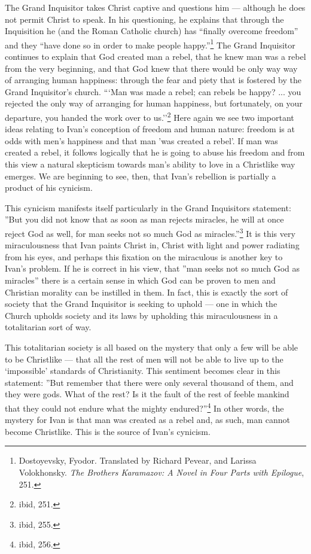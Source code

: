 	The Grand Inquisitor takes Christ captive and questions him --- although he does not permit Christ to speak. In his questioning, he explains that through the Inquisition he (and the Roman Catholic church) has ``finally overcome freedom'' and they ``have done so in order to make people happy.''\footnote{Dostoyevsky, Fyodor. Translated by Richard Pevear, and Larissa Volokhonsky. \emph{The Brothers Karamazov: A Novel in Four Parts with Epilogue}, 251.} The Grand Inquisitor continues to explain that God created man a rebel, that he knew man was a rebel from the very beginning, and that God knew that there would be only way way of arranging human happiness: through the fear and piety that is fostered by the Grand Inquisitor's church. ```Man was made a rebel; can rebels be happy? ... you rejected the only way of arranging for human happiness, but fortunately, on your departure, you handed the work over to us.''\footnote{ibid, 251.} Here again we see two important ideas relating to Ivan's conception of freedom and human nature: freedom is at odds with men's happiness and that man 'was created a rebel'. If man was created a rebel, it follows logically that he is going to abuse his freedom and from this view a natural skepticism towards man's ability to love in a Christlike way emerges. We are beginning to see, then, that Ivan's rebellion is partially a product of his cynicism.

	This cynicism manifests itself particularly in the Grand Inquisitors statement: ''But you did not know that as soon as man rejects miracles, he will at once reject God as well, for man seeks not so much God as miracles.''\footnote{ibid, 255.} It is this very miraculousness that Ivan paints Christ in, Christ with light and power radiating from his eyes, and perhaps this fixation on the miraculous is another key to Ivan's problem. If he is correct in his view, that ''man seeks not so much God as miracles'' there is a certain sense in which God can be proven to men and Christian morality can be instilled in them. In fact, this is exactly the sort of society that the Grand Inquisitor is seeking to uphold --- one in which the Church upholds society and its laws by upholding this miraculousness in a totalitarian sort of way.

	This totalitarian society is all based on the mystery that only a few will be able to be Christlike --- that all the rest of men will not be able to live up to the `impossible' standards of Christianity. This sentiment becomes clear in this statement: ''But remember that there were only several thousand of them, and they were gods. What of the rest? Is it the fault of the rest of feeble mankind that they could not endure what the mighty endured?''\footnote{ibid, 256.} In other words, the mystery for Ivan is that man was created as a rebel and, as such, man cannot become Christlike. This is the source of Ivan's cynicism. 
	
